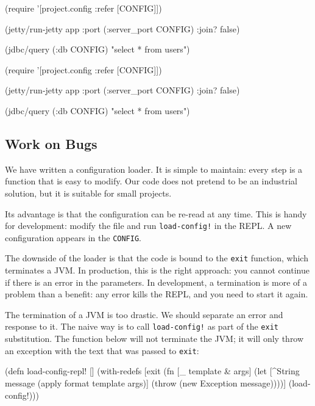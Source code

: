 \begin{clojure}
(require
  '[project.config :refer [CONFIG]])

(jetty/run-jetty app
  {:port (:server_port CONFIG)
   :join? false})

(jdbc/query (:db CONFIG)
  "select * from users")
\end{clojure}

\else

\begin{clojure}
(require '[project.config :refer [CONFIG]])

(jetty/run-jetty app {:port (:server_port CONFIG)
                      :join? false})

(jdbc/query (:db CONFIG) "select * from users")
\end{clojure}

\fi

\subsection{Work on Bugs}

We have written a configuration loader. It is simple to maintain: every step is a function that is easy to modify.
Our code does not pretend to be an industrial solution, but it is suitable for small projects.

Its advantage is that the configuration can be re-read at any time. This is handy for development: modify the file and run \verb|load-config!| in the REPL. A new configuration appears in the \verb|CONFIG|.


The downside of the loader is that the code is bound to the \verb|exit| function, which terminates a JVM. In production, this is the right approach: you cannot continue if there is an error in the parameters. In development, a termination is more of a problem than a benefit: any error kills the REPL, and you need to start it again.

The termination of a JVM is too drastic. We should separate an error and response to it. The naive way is to call \verb|load-config!| as part of the \verb|exit| substitution. The function below will not terminate the JVM; it will only throw an exception with the text that was passed to \verb|exit|:

\ifx\DEVICETYPE\MOBILE

\begin{clojure}
(defn load-config-repl! []
  (with-redefs
    [exit
     (fn [_ template & args]
       (let [^String message
             (apply format
               template args)]
         (throw
           (new Exception message))))]
    (load-config!)))
\end{clojure}

